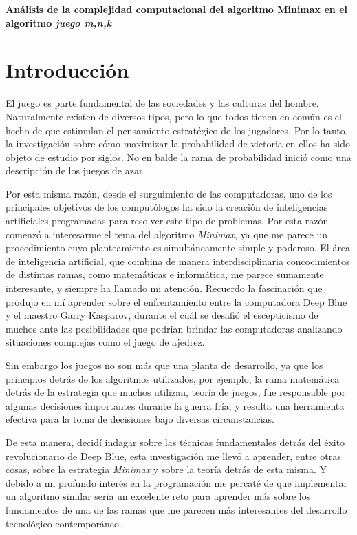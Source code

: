 \normalsize
\Large{\textbf{Análisis de la complejidad computacional del algoritmo Minimax en el algoritmo \emph{juego m,n,k}}}

\section{Introducción}
El juego es parte fundamental de las sociedades y las culturas del hombre.
Naturalmente existen de diversos tipos, pero lo que todos tienen en común es el
hecho de que estimulan el pensamiento estratégico de  los jugadores. Por lo
tanto, la investigación sobre cómo maximizar la probabilidad de victoria en
ellos ha sido objeto de estudio por siglos. No en balde la rama de probabilidad
inició como una descripción de los juegos de azar. 

Por esta misma razón, desde el surguimiento de las computadoras, uno de los
principales objetivos de los computólogos ha sido la creación de inteligencias
artificiales programadas para resolver este tipo de problemas. Por esta razón
comenzó a interesarme el tema del algoritmo \emph{Minimax}, ya que me parece un
procedimiento cuyo planteamiento es simultáneamente simple y poderoso. El área
de inteligencia artificial, que combina de manera interdisciplinaria
concocimientos de distintas ramas, como matemáticas e informática, me parece
sumamente interesante, y siempre ha llamado mi atención. Recuerdo la fascinación
que produjo en mí aprender sobre el enfrentamiento entre la computadora Deep
Blue y el maestro Garry Kasparov, durante el cuál se desafió el escepticismo de
muchos ante las posibilidades que podrían brindar las computadoras analizando
situaciones complejas como el juego de ajedrez. 

Sin embargo los juegos no son más que una planta de desarrollo, ya que los
principios detrás de los algoritmos utilizados, por ejemplo, la rama
matemática detrás de la estrategia que muchos utilizan, teoría de juegos, fue responsable por algunas
decisiones importantes durante la guerra fría, y resulta una herramienta
efectiva para la toma de decisiones bajo diversas circunstancias. 

De esta manera, decidí indagar sobre las técnicas fundamentales detrás del éxito
revolucionario de Deep Blue, esta investigación me llevó a aprender, entre otras
cosas, sobre la
estrategia \emph{Minimax} y sobre la teoría detrás de esta misma. Y debido a  mi profundo interés en
la programación me percaté de que implementar un algoritmo similar seria un
excelente reto para aprender más sobre los fundamentos de una de las ramas que
me parecen más interesantes del desarrollo tecnológico contemporáneo. 

